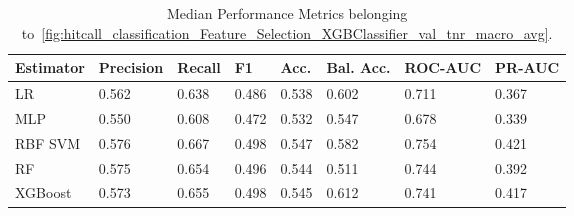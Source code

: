 \begin{longtable}{llllllll}
\caption{Median Performance Metrics belonging to~\ref{fig:hitcall_classification_Feature_Selection_XGBClassifier_val_tnr_macro_avg}.}\label{tab:table:hitcall_classification_feature_selection_xgbclassifier_val_tnr_macro_avg}\\
\toprule
\midrule
\small Estimator & \small Precision & \small Recall & \small F1 & \small Acc. & \small Bal. Acc. & \small ROC-AUC & \small PR-AUC\\
\hline
LR & 0.562 & 0.638 & 0.486 & 0.538 & 0.602 & 0.711 & 0.367\\
MLP & 0.550 & 0.608 & 0.472 & 0.532 & 0.547 & 0.678 & 0.339\\
RBF SVM & 0.576 & 0.667 & 0.498 & 0.547 & 0.582 & 0.754 & 0.421\\
RF & 0.575 & 0.654 & 0.496 & 0.544 & 0.511 & 0.744 & 0.392\\
XGBoost & 0.573 & 0.655 & 0.498 & 0.545 & 0.612 & 0.741 & 0.417\\
\bottomrule
\end{longtable}
